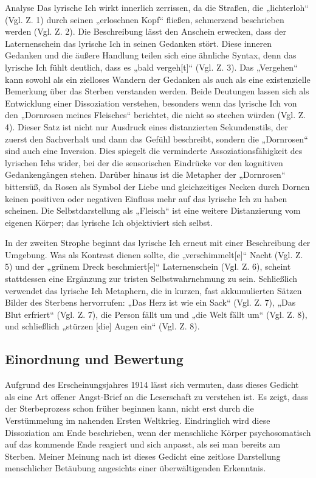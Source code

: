 \documentclass[11pt,a4paper,oneside]{article}
\begin{document}
\begin{loesung}{Analyse}
		Das lyrische Ich wirkt innerlich zerrissen, da die Straßen, die „lichterloh“ (Vgl. Z. 1) durch seinen „erloschnen Kopf“ fließen, schmerzend beschrieben werden (Vgl. Z. 2). Die Beschreibung lässt den Anschein erwecken, dass der Laternenschein das lyrische Ich in seinen Gedanken stört. Diese inneren Gedanken und die äußere Handlung teilen sich eine ähnliche Syntax, denn das lyrische Ich fühlt deutlich, dass es „bald vergeh[t]“ (Vgl. Z. 3). Das „Vergehen“ kann sowohl als ein zielloses Wandern der Gedanken als auch als eine existenzielle Bemerkung über das Sterben verstanden werden. Beide Deutungen lassen sich als Entwicklung einer Dissoziation verstehen, besonders wenn das lyrische Ich von den „Dornrosen meines Fleisches“ berichtet, die nicht so stechen würden (Vgl. Z. 4). Dieser Satz ist nicht nur Ausdruck eines distanzierten Sekundenstils, der zuerst den Sachverhalt und dann das Gefühl beschreibt, sondern die „Dornrosen“ sind auch eine Inversion. Dies spiegelt die verminderte Assoziationsfähigkeit des lyrischen Ichs wider, bei der die sensorischen Eindrücke vor den kognitiven Gedankengängen stehen. Darüber hinaus ist die Metapher der „Dornrosen“ bittersüß, da Rosen als Symbol der Liebe und gleichzeitiges Necken durch Dornen keinen positiven oder negativen Einfluss mehr auf das lyrische Ich zu haben scheinen. Die Selbstdarstellung als „Fleisch“ ist eine weitere Distanzierung vom eigenen Körper; das lyrische Ich objektiviert sich selbst.
		
		In der zweiten Strophe beginnt das lyrische Ich erneut mit einer Beschreibung der Umgebung. Was als Kontrast dienen sollte, die „verschimmelt[e]“ Nacht (Vgl. Z. 5) und der „grünem Dreck beschmiert[e]“ Laternenschein (Vgl. Z. 6), scheint stattdessen eine Ergänzung zur tristen Selbstwahrnehmung zu sein. Schließlich verwendet das lyrische Ich Metaphern, die in kurzen, fast akkumulierten Sätzen Bilder des Sterbens hervorrufen: „Das Herz ist wie ein Sack“ (Vgl. Z. 7), „Das Blut erfriert“ (Vgl. Z. 7), die Person fällt um und „die Welt fällt um“ (Vgl. Z. 8), und schließlich „stürzen [die] Augen ein“ (Vgl. Z. 8).
		\vspace{5mm}
		
		\subsection*{Einordnung und Bewertung}
		Aufgrund des Erscheinungsjahres 1914 lässt sich vermuten, dass dieses Gedicht als eine Art offener Angst-Brief an die Leserschaft zu verstehen ist. Es zeigt, dass der Sterbeprozess schon früher beginnen kann, nicht erst durch die Verstümmelung im nahenden Ersten Weltkrieg. Eindringlich wird diese Dissoziation am Ende beschrieben, wenn der menschliche Körper psychosomatisch auf das kommende Ende reagiert und sich anpasst, als sei man bereits am Sterben. Meiner Meinung nach ist dieses Gedicht eine zeitlose Darstellung menschlicher Betäubung angesichts einer überwältigenden Erkenntnis.
	\end{loesung}
	
\end{document}
